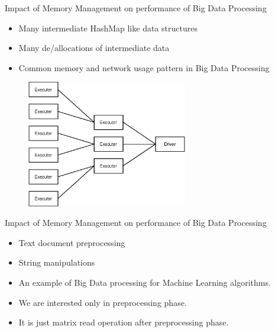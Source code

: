 \documentclass[9pt]{beamer}
\begin{document}
\begin{frame}[fragile]{Impact of Memory Management on performance of Big Data Processing}
\begin{itemize}
    \item Many intermediate HashMap like data structures
    \item Many de/allocations of intermediate data
    \item Common memory and network usage pattern in Big Data Processing
\end{itemize}

\begin{figure}[htb]
    \begin{minipage}[t]{0.5\linewidth}\centering
        \includegraphics[width=7cm]{images/tree_agg.eps} 
    \end{minipage}
\end{figure}

\end{frame}

\begin{frame}[fragile]{Impact of Memory Management on performance of Big Data Processing}
    \begin{itemize}
        \item Text document preprocessing 
        \item String manipulations
        \item An example of Big Data processing for Machine Learning algorithms.
        \item We are interested only in preprocessing phase.
        \item It is just matrix read operation after preprocessing phase.
    \end{itemize}    

\end{frame}
\end{document}
